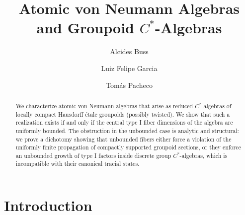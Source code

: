 \newcommand{\N}{\mathbb N}
\newcommand{\C}{\mathbb C}
\newcommand{\T}{\mathbb T}
\newcommand{\B}{\mathcal B}
\newcommand{\K}{\mathcal K}
\newcommand{\supp}{\mathrm{supp}}
\renewcommand{\span}{\mathrm{span}}
\newcommand{\dist}{\mathrm{dist}}

\title{Atomic von Neumann Algebras and Groupoid $C^*$-Algebras}


\author[Alcides Buss]{Alcides Buss}
\address[Alcides Buss]{Departamento de Matem\'atica, Universidade Federal de Santa Catarina, 88.040-900
Florian\'opolis-SC, Brazil}

\author[Luiz F. Garcia]{Luiz Felipe Garcia}
\address[Luiz F. Garcia]{Departamento de Matem\'atica, Universidade Federal de Santa Catarina, 88.040-900
Florian\'opolis-SC, Brazil}

\author[Tomás Pacheco]{Tomás Pacheco}
\address[Tomás Pacheco]{Center for Mathematical Analysis, Geometry and Dynamical Systems,
Department of Mathematics, Instituto Superior T\'ecnico, University of Lisbon,
Av. Rovisco Pais 1, 1049-001 Lisboa, Portugal}





\maketitle

\begin{abstract}
We characterize atomic von Neumann algebras that arise as reduced $C^*$-algebras of locally compact Hausdorff étale groupoids (possibly twisted). We show that such a realization exists if and only if the central type I fiber dimensions of the algebra are uniformly bounded. The obstruction in the unbounded case is analytic and structural: we prove a dichotomy showing that unbounded fibers either force a violation of the uniformly finite propagation of compactly supported groupoid sections, or they enforce an unbounded growth of type I factors inside discrete group $C^*$-algebras, which is incompatible with their canonical tracial states.
\end{abstract}

\section{Introduction}

